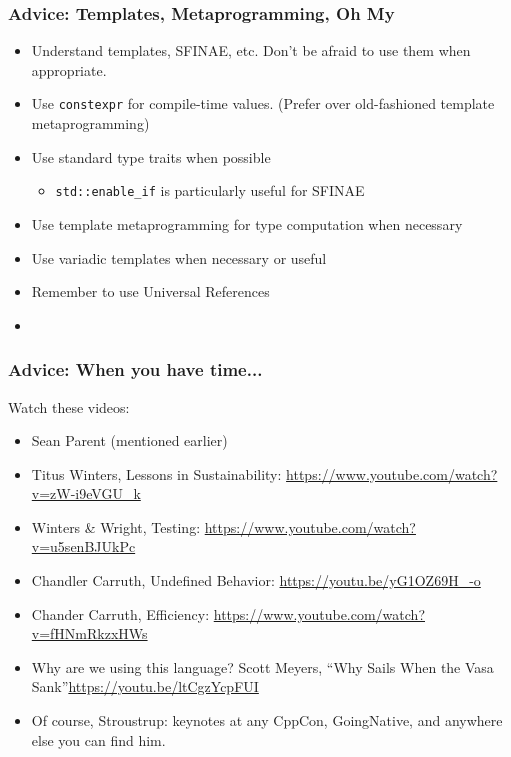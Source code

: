 \begin{frame}[fragile,t]
\frametitle{Advice: Templates, Metaprogramming, Oh My}
\begin{itemize}[<+->]
\item Understand templates, SFINAE, etc.  Don't be afraid to use them
  when appropriate.
\item Use \texttt{constexpr} for compile-time values. (Prefer over
  old-fashioned template metaprogramming)
\item Use standard type traits when possible
  \begin{itemize}
  \item \texttt{std::enable\_if} is particularly useful for SFINAE
  \end{itemize}
\item Use template metaprogramming for type computation when necessary
\item Use variadic templates when necessary or useful
\item Remember to use Universal References
\vskip 12pt
\item {}
\end{itemize}
\end{frame}

\begin{frame}[fragile,t]
\frametitle{Advice: When you have time...}
Watch these videos:
\begin{itemize}[<+->]
\item Sean Parent (mentioned earlier)
\item Titus Winters, Lessons in Sustainability: \url{https://www.youtube.com/watch?v=zW-i9eVGU_k}
\item Winters \& Wright, Testing: \url{https://www.youtube.com/watch?v=u5senBJUkPc}
\item Chandler Carruth, Undefined Behavior:
   \url{https://youtu.be/yG1OZ69H_-o}
\item Chander Carruth, Efficiency: \url{https://www.youtube.com/watch?v=fHNmRkzxHWs}
\vskip 6pt
\item Why are we using this language? Scott Meyers, ``Why \CC Sails
  When the Vasa Sank''\url{https://youtu.be/ltCgzYcpFUI}
\item Of course, Stroustrup: keynotes at any CppCon, GoingNative, and
  anywhere else you can find him.
\end{itemize}

\end{frame}
